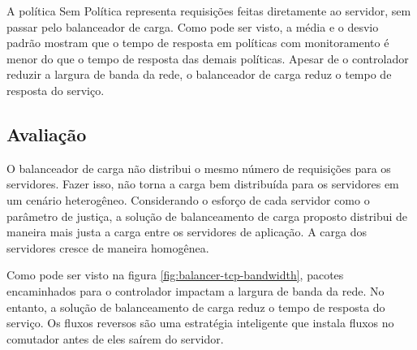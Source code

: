 A política Sem Política representa requisições feitas diretamente ao servidor, 
sem passar pelo balanceador de carga.
Como pode ser visto, a média e o desvio padrão mostram que o tempo de resposta
em políticas com monitoramento é menor do que o tempo de resposta das demais
políticas.
Apesar de o controlador reduzir a largura de banda da rede, o balanceador 
de carga reduz o tempo de resposta do serviço.

\subsection{Avaliação}

O balanceador de carga não distribui o mesmo número de requisições para 
os servidores.
Fazer isso, não torna a carga bem distribuída para os servidores em um 
cenário heterogêneo. 
Considerando o esforço de cada servidor como o parâmetro de justiça, a solução
de balanceamento de carga proposto distribui de maneira mais justa a carga 
entre os servidores de aplicação.
A carga dos servidores cresce de maneira homogênea.

Como pode ser visto na figura \ref{fig:balancer-tcp-bandwidth}, pacotes 
encaminhados para o controlador impactam a largura de banda da rede.
No entanto, a solução de balanceamento de carga reduz o tempo de resposta 
do serviço. 
Os fluxos reversos são uma estratégia inteligente que instala fluxos no 
comutador antes de eles saírem do servidor.
